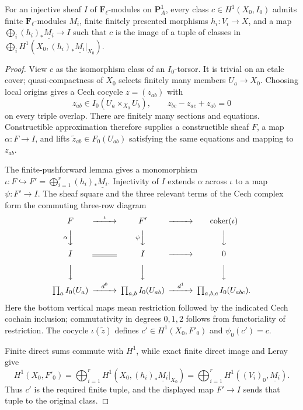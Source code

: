 \begin{lemma}
\label{lemma:weil-pbc-h1-constructible-representation}
\uses{}

For an injective sheaf $I$ of $\mathbf F_\ell$-modules on $\mathbf P^1_A$,
every class
$c\in H^1(X_0,I_0)$ admits finite $\mathbf F_\ell$-modules $M_i$, finite finitely presented
morphisms $h_i:V_i\to X$, and a map
$\bigoplus_i(h_i)_*\underline{M_i}\to I$ such that $c$ is the image of a
tuple of classes in
$\bigoplus_iH^1(X_0,(h_i)_*\underline{M_i}|_{X_0})$.
\end{lemma}
\begin{proof}

View $c$ as the isomorphism class of an $I_0$-torsor.  It is trivial on an
etale cover; quasi-compactness of $X_0$ selects finitely many members
$U_a\to X_0$.  Choosing local origins gives a Cech cocycle
$z=(z_{ab})$ with
\[
 z_{ab}\in I_0(U_a\times_{X_0}U_b),\qquad
 z_{bc}-z_{ac}+z_{ab}=0
\]
on every triple overlap.  There are finitely many sections and equations.
Constructible approximation therefore supplies a constructible sheaf $F$, a
map $\alpha:F\to I$, and lifts $\widetilde z_{ab}\in F_0(U_{ab})$
satisfying the same equations and mapping to $z_{ab}$.

The finite-pushforward lemma gives a monomorphism
$\iota:F\hookrightarrow F'=\bigoplus_{i=1}^r(h_i)_*\underline{M_i}$.
Injectivity of $I$ extends $\alpha$ across $\iota$ to a map
$\psi:F'\to I$.  The sheaf square and the three relevant terms of the Cech
complex form the commuting three-row diagram
\[
\begin{CD}
 F @>{\iota}>> F' @>>> \operatorname{coker}(\iota)\\
 @V{\alpha}VV @V{\psi}VV @VVV\\
 I @= I @>>> 0\\[2pt]
 @VVV @VVV @VVV\\
 \prod_a I_0(U_a) @>{d^0}>>
 \prod_{a,b} I_0(U_{ab}) @>{d^1}>>
 \prod_{a,b,c} I_0(U_{abc}).
\end{CD}
\]
Here the bottom vertical maps mean restriction followed by the indicated
Cech cochain inclusion; commutativity in degrees $0,1,2$ follows from
functoriality of restriction.  The cocycle $\iota(\widetilde z)$ defines
$c'\in H^1(X_0,F'_0)$ and $\psi_0(c')=c$.

Finite direct sums commute with $H^1$, while exact finite direct image and
Leray give
\[
 H^1(X_0,F'_0)=
 \bigoplus_{i=1}^rH^1(X_0,(h_i)_*\underline{M_i}|_{X_0})
 =\bigoplus_{i=1}^rH^1((V_i)_0,\underline{M_i}).
\]
Thus $c'$ is the required finite tuple, and the displayed map $F'\to I$
sends that tuple to the original class.
\end{proof}

